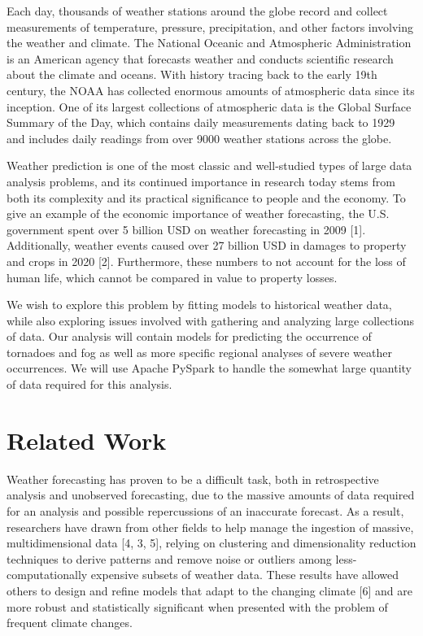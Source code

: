 \documentclass[conference]{IEEEtran}
\begin{document}
Each day, thousands of weather stations around the globe record and collect measurements of temperature, pressure, precipitation, and other factors involving the weather and climate. The National Oceanic and Atmospheric Administration is an American agency that forecasts weather and conducts scientific research about the climate and oceans. With history tracing back to the early 19th century, the NOAA has collected enormous amounts of atmospheric data since its inception. One of its largest collections of atmospheric data is the Global Surface Summary of the Day, which contains daily measurements dating back to 1929 and includes daily readings from over 9000 weather stations across the globe.

Weather prediction is one of the most classic and well-studied types of large data analysis problems, and its continued importance in research today stems from both its complexity
and its practical significance to people and the economy. To give an example of the economic importance of weather forecasting, the U.S. government spent over 5 billion USD on weather forecasting in 2009 [1]. Additionally, weather events caused over 27 billion USD in damages to property and crops in 2020 [2]. Furthermore, these numbers to not account for the loss of human life, which cannot be compared in value to property losses.

We wish to explore this problem by fitting models to historical weather data, while also exploring issues involved with gathering and analyzing large collections of data. Our analysis will contain models for predicting the occurrence of tornadoes and fog as well as more specific regional analyses of severe weather occurrences. We will use Apache PySpark to handle the somewhat large quantity of data required for this analysis. 

\section{Related Work}

Weather forecasting has proven to be a difficult task, both in retrospective analysis and unobserved forecasting, due to the massive amounts of data required for an analysis and possible repercussions of an inaccurate forecast. As a result, researchers have drawn from other fields to help manage the ingestion of massive, multidimensional data [4, 3, 5], relying on clustering and dimensionality reduction techniques to derive patterns and remove noise or outliers among less-computationally expensive subsets of weather data. These results have allowed others to design and refine models that adapt to the changing climate [6] and are more robust and statistically significant when presented with the problem of frequent climate changes.
\end{document}
